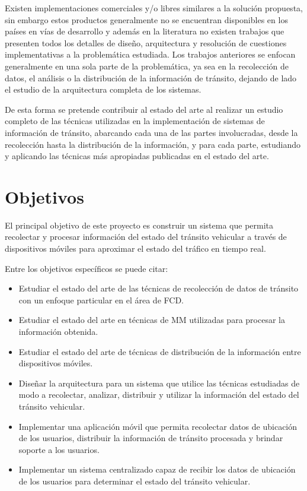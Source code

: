Existen implementaciones comerciales y/o libres similares a la solución propuesta, sin embargo estos productos generalmente no se encuentran disponibles en los países en vías de desarrollo y además en la literatura no existen trabajos que presenten todos los detalles de diseño, arquitectura y resolución de cuestiones implementativas a la problemática estudiada. Los trabajos anteriores se enfocan generalmente en una sola parte de la problemática, ya sea en la recolección de datos, el análisis o la distribución de la información de tránsito, dejando de lado el estudio de la arquitectura completa de los sistemas.

De esta forma se pretende contribuir al estado del arte al realizar un estudio completo de las técnicas utilizadas en la implementación de sistemas de información de tránsito, abarcando cada una de las partes involucradas, desde la recolección hasta la distribución de la información, y para cada parte, estudiando y aplicando las técnicas más apropiadas publicadas en el estado del arte.

\section{Objetivos}

El principal objetivo de este proyecto es construir un sistema que permita recolectar y procesar información del estado del tránsito vehicular a través de dispositivos móviles para aproximar el estado del tráfico en tiempo real.

Entre los objetivos específicos se puede citar:

\begin{itemize}

\item Estudiar el estado del arte de las técnicas de recolección de datos de tránsito con un enfoque particular en el área de FCD.

\item Estudiar el estado del arte en técnicas de MM utilizadas para procesar la información obtenida.

\item Estudiar el estado del arte de técnicas de distribución de la información entre dispositivos móviles.

\item Diseñar la arquitectura para un sistema que utilice las técnicas estudiadas de modo a recolectar, analizar, distribuir y utilizar la información del estado del tránsito vehicular.

\item Implementar una aplicación móvil que permita recolectar datos de ubicación de los usuarios, distribuir la información de tránsito procesada y brindar soporte a los usuarios.

\item Implementar un sistema centralizado capaz de recibir los datos de ubicación de los usuarios para determinar el estado del tránsito vehicular.

\end{itemize}

